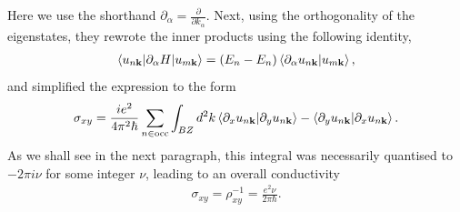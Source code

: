 Here we use the shorthand $\partial_\alpha = \frac \partial {\partial k_\alpha}$. Next, using the orthogonality of the eigenstates, they rewrote the inner products using the following identity,
\begin{align}
    \braket{u_{n\textbf k}| \partial_\alpha H | u_{m\textbf k}} = (E_n - E_n) \braket{\partial_\alpha u_{n\textbf k} | u_{m\textbf k}},
\end{align}
and simplified the expression to the form
\begin{align}
    \sigma_{xy} =  \frac{ie^2}{4\pi^2\hbar} \sum_{
        n \in \textup{occ} }
        \int_{BZ} d^2k
            \braket{ \partial_x u_{n\textbf k}| \partial_y  u_{n\textbf k}}
            - \braket{ \partial_y u_{n\textbf k}| \partial_x  u_{n\textbf k}}.
\end{align}
As we shall see in the next paragraph, this integral was necessarily quantised to $-2\pi i \nu$ for some integer $\nu$, leading to an overall conductivity
\begin{align}
    \sigma_{xy} =\rho_{xy}^{-1} = \frac{e^2 \nu}{2\pi \hbar}.
\end{align}

